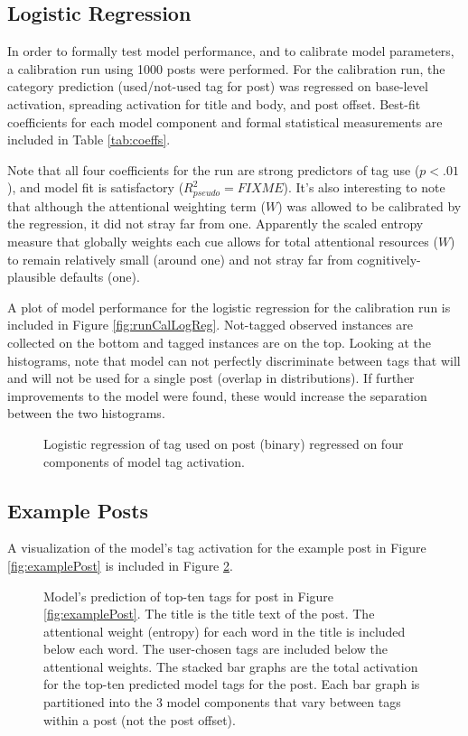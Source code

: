 \documentclass[10pt,letterpaper]{article}
\begin{document}
\subsection{Logistic Regression}

In order to formally test model performance, and to calibrate model parameters, a calibration run using \num{1000} posts were performed.
For the calibration run, the category prediction (used/not-used tag for post) was regressed on base-level activation, spreading activation for title and body, and post offset.
Best-fit coefficients for each model component and formal statistical measurements are included in Table \ref{tab:coeffs}.

Note that all four coefficients for the run are strong predictors of tag use ($p<.01$), and model fit is satisfactory ($R_{pseudo}^{2}=FIXME$).
It's also interesting to note that although the attentional weighting term ($W$) was allowed to be calibrated by the regression, it did not stray far from one.
Apparently the scaled entropy measure that globally weights each cue allows for total attentional resources ($W$) to remain relatively small (around one) and not stray far from cognitively-plausible defaults (one).

A plot of model performance for the logistic regression for the calibration run is included in Figure \ref{fig:runCalLogReg}.
Not-tagged observed instances are collected on the bottom and tagged instances are on the top.
Looking at the histograms, note that model can not perfectly discriminate between tags that will and will not be used for a single post (overlap in distributions).
If further improvements to the model were found, these would increase the separation between the two histograms.

\begin{figure}[ht]
  \centering
  \caption{
    Logistic regression of tag used on post (binary) regressed on four components of model tag activation.
  }
  \label{fig:logReg}
\end{figure}

\subsection{Example Posts}

A visualization of the model's tag activation for the example post in Figure \ref{fig:examplePost} is included in Figure \ref{fig:modelPost}.

\begin{figure}[ht]
  \centering
  \caption{
    Model's prediction of top-ten tags for post in Figure \ref{fig:examplePost}.
    The title is the title text of the post.
    The attentional weight (entropy) for each word in the title is included below each word.
    The user-chosen tags are included below the attentional weights.
    The stacked bar graphs are the total activation for the top-ten predicted model tags for the post.
    Each bar graph is partitioned into the 3 model components that vary between tags within a post (not the post offset).
}
  \label{fig:modelPost}
\end{figure}
\end{document}
